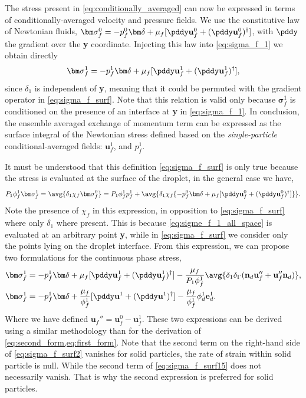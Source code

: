 The stress present in \ref{eq:conditionally_averaged} can now be expressed in terms of conditionally-averaged velocity and pressure fields. 
We use the constitutive law of Newtonian fluids, $\bm\sigma_f^0 = -p_f^0 \bm\delta + \mu_f [\pddy \textbf{u}_f^0+ (\pddy \textbf{u}_f^0)^\dagger]$, with $\pddy$ the gradient over the \textbf{y} coordinate.
Injecting this law into \ref{eq:sigma_f_1} we obtain directly 
\begin{equation}
    \bm\sigma_f^1
    = - p_f^1 \bm\delta
    +\mu_f [\pddy \textbf{u}_f^1+(\pddy \textbf{u}_f^1)^\dagger], 
    \label{eq:sigma_f_surf}
\end{equation}
since $\delta_1$ is independent of \textbf{y}, meaning that it could be permuted with the gradient operator in \ref{eq:sigma_f_surf}. 
Note that this relation is valid only because $\bm\sigma_f^1$ is conditioned on the presence of an interface at \textbf{y} in \ref{eq:sigma_f_1}. 
In conclusion, the ensemble averaged exchange of momentum term can be expressed as the surface integral of the Newtonian stress defined based on the \textit{single-particle} conditional-averaged fields: $\textbf{u}_f^1$, and $p_f^1$. 

It must be understood that this definition \eqref{eq:sigma_f_surf} is only true because the stress is evaluated at the surface of the droplet, in the general case we have, 
\begin{equation}
    P_1 \phi_f^1 \bm\sigma_f^1
    =
    \avg{\delta_1 \chi_f \bm\sigma_f^0}
    =
    P_1 \phi_f^1 p_f^1
    +  \avg{\delta_1\chi_f \{ - p_f^0 \bm\delta + \mu_f [\pddy \textbf{u}_f^0+  (\pddy \textbf{u}_f^0)^\dagger]\}}. 
    \label{eq:sigme_f_1_all_space}
\end{equation}
Note the presence of $\chi_f$ in this expression, in opposition to \ref{eq:sigma_f_surf} where only $\delta_1$ where present.
This is because \ref{eq:sigme_f_1_all_space} is evaluated at an arbitrary point \textbf{y}, while in \ref{eq:sigma_f_surf} we consider only the points lying on the droplet interface.  
From this expression, we can propose two formulations for the continuous phase stress,   
\begin{align}    
    \bm\sigma_f^1
    &= 
    - p_f^1 \bm\delta 
    + \mu_f [\pddy \textbf{u}_f^1+ (\pddy \textbf{u}_f^1)^\dagger ]
    - \frac{\mu_f }{P_1 \phi_f^1}\avg{\delta_1 \delta_\Gamma (\textbf{n}_d \textbf{u}_f''+  \textbf{u}_f'' \textbf{n}_d)},
    \label{eq:sigma_f_surf15}
    \\
    \bm\sigma_f^1
    &= 
    - p_f^1 \bm\delta 
    + \frac{\mu_f }{\phi_f^1} [\pddy \textbf{u}^1+ (\pddy \textbf{u}^1)^\dagger ]
    - \frac{\mu_f }{\phi_f^1} \phi_d^1 \textbf{e}_d^1. 
    \label{eq:sigma_f_surf2}
\end{align}
Where we have defined $\textbf{u}_f'' = \textbf{u}_f^0 - \textbf{u}_f^1$. 
These two expressions can be derived using a similar methodology than for the derivation of \ref{eq:second_form,eq:first_form}. 
Note that the second term on the right-hand side of \ref{eq:sigma_f_surf2} vanishes for solid particles, the rate of strain within solid particle is null.
While the second term of \ref{eq:sigma_f_surf15} does not necessarily vanish. 
That is why the second expression is preferred for solid particles. 

